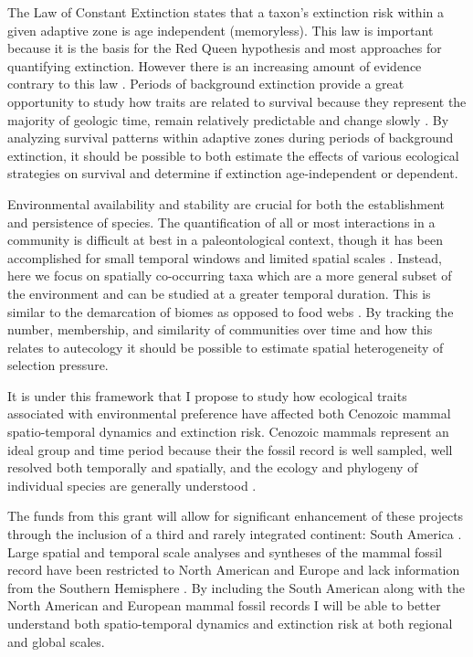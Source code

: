 \documentclass[11pt,letterpaper]{article}
\begin{document}
The Law of Constant Extinction \citep{VanValen1973} states that a taxon's extinction risk within a given adaptive zone is age independent (memoryless). This law is important because it is the basis for the Red Queen hypothesis and most approaches for quantifying extinction. However there is an increasing amount of evidence contrary to this law \citep{Drake2014,Raup1975,Sepkoski1975,Finnegan2008}. Periods of background extinction provide a great opportunity to study how traits are related to survival because they represent the majority of geologic time, remain relatively predictable and change slowly \citep{Jablonski1986,Raup1988}. By analyzing survival patterns within adaptive zones during periods of background extinction, it should be possible to both estimate the effects of various ecological strategies on survival and determine if extinction age-independent or dependent.

Environmental availability and stability are crucial for both the establishment and persistence of species. The quantification of all or most interactions in a community is difficult at best in a paleontological context, though it has been accomplished for small temporal windows and limited spatial scales \citep{Angielczyk2005,Mitchell2012,Roopnarine2007}. Instead, here we focus on spatially co-occurring taxa which are a more general subset of the environment and can be studied at a greater temporal duration. This is similar to the demarcation of biomes as opposed to food webs \citep{Vilhena2013b}. By tracking the number, membership, and similarity of communities over time and how this relates to autecology it should be possible to estimate spatial heterogeneity of selection pressure.

It is under this framework that I propose to study how ecological traits associated with environmental preference have affected both Cenozoic mammal spatio-temporal dynamics and extinction risk. Cenozoic mammals represent an ideal group and time period because their the fossil record is well sampled, well resolved both temporally and spatially, and the ecology and phylogeny of individual species are generally understood \citep{Alroy2009,Alroy2000g,Jernvall2002,Liow2008,Smith2004}. 

The funds from this grant will allow for significant enhancement of these projects through the inclusion of a third and rarely integrated continent: South America \citep{Stromberg2013,Marshall1982}. Large spatial and temporal scale analyses and syntheses of the mammal fossil record have been restricted to North American and Europe and lack information from the Southern Hemisphere \citep{Jernvall2004,Jernvall2002,Fortelius2002,Janis2000,Alroy1996a,Alroy1998,Alroy2000g,Liow2008,Raia2006,Tomiya2013}. By including the South American along with the North American and European mammal fossil records I will be able to better understand both spatio-temporal dynamics and extinction risk at both regional and global scales. 
\end{document}
